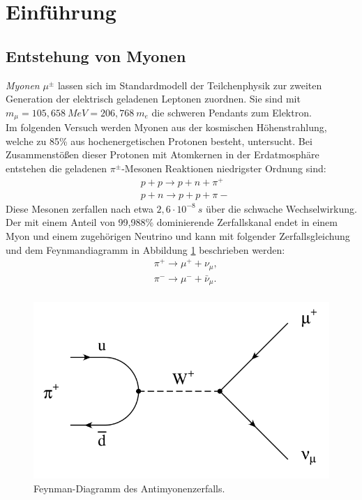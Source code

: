 \section{Einführung}

	\subsection{Entstehung von Myonen}
	\textit{Myonen} $\mu^{\pm}$ lassen sich im Standardmodell der Teilchenphysik zur zweiten Generation der elektrisch geladenen Leptonen zuordnen. Sie sind mit $m_\mu = 105,658\ \unit{MeV = 206,768\ m_e}$\cite{pdg} die schweren Pendants zum Elektron.\\
	Im folgenden Versuch werden Myonen aus der kosmischen Höhenstrahlung, welche zu 85\% aus hochenergetischen Protonen besteht, untersucht. Bei Zusammenstößen dieser Protonen mit Atomkernen in der Erdatmosphäre entstehen die geladenen $\pi^\pm$-Mesonen Reaktionen niedrigster Ordnung sind:
		\begin{align*}
			&p + p \longrightarrow p + n + \pi^+\\
			&p + n \longrightarrow p + p + \pi-
		\end{align*}
	Diese Mesonen zerfallen nach etwa $2,6\cdot10^{-8}\ \unit{s}$ über die schwache Wechselwirkung. Der mit einem Anteil von 99,988\% dominierende Zerfallskanal endet in einem Myon und einem zugehörigen Neutrino und kann mit folgender Zerfallsgleichung und dem Feynmandiagramm in Abbildung \ref{fig:pionzerfall} beschrieben werden:
		\begin{align*}
			&\pi^+ \longrightarrow \mu^+ + \nu_\mu \text{,}\\
			&\pi^- \longrightarrow \mu^- + \bar{\nu}_\mu \text{.}\\
		\end{align*}
		\begin{figure}[hp]
					\centering
					\includegraphics[width = 0.7\linewidth]{pic/pionzerfall.png}
					\caption{Feynman-Diagramm des Antimyonenzerfalls.}
					\label{fig:pionzerfall}
		\end{figure}
		
